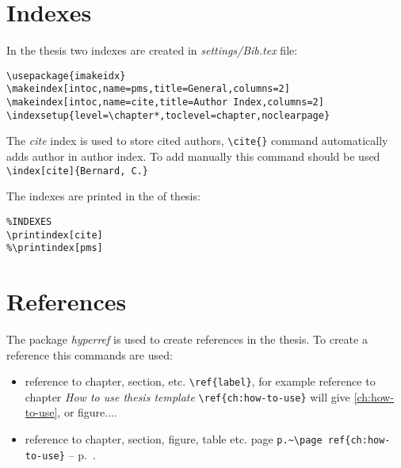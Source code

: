 \section{Indexes}

In the thesis two indexes are created in \textit{settings/Bib.tex} file:

\begin{lstlisting}
\usepackage{imakeidx}
\makeindex[intoc,name=pms,title=General,columns=2]
\makeindex[intoc,name=cite,title=Author Index,columns=2]
\indexsetup{level=\chapter*,toclevel=chapter,noclearpage}
\end{lstlisting}

The \textit{cite} index is used to store cited authors, \lstinline|\cite{}| command automatically adds author in author index. To add manually this command should be used \lstinline|\index[cite]{Bernard, C.}|


The indexes are printed in the of thesis:

\begin{lstlisting}
%INDEXES
\printindex[cite]
%\printindex[pms]
\end{lstlisting}


\section{References}

The package \textit{hyperref} is used to create references in the thesis. To create a reference this commands are used:
\begin{itemize}
	\item reference to chapter, section, etc. \lstinline|\ref{label}|, for example reference to chapter \textit{How to use thesis template}  \lstinline|\ref{ch:how-to-use}| will give \ref{ch:how-to-use}, or figure....
	\item reference to chapter, section, figure, table etc. page \lstinline|p.~\page ref{ch:how-to-use}| -- p.~\pageref{ch:how-to-use}. 
\end{itemize}


\stopcontents[chapter]
